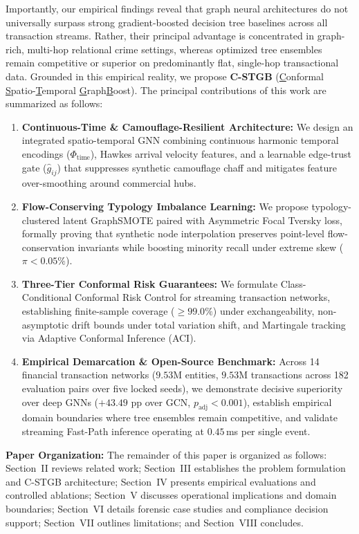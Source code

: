Importantly, our empirical findings reveal that graph neural architectures do not universally surpass strong gradient-boosted decision tree baselines across all transaction streams. Rather, their principal advantage is concentrated in graph-rich, multi-hop relational crime settings, whereas optimized tree ensembles remain competitive or superior on predominantly flat, single-hop transactional data. Grounded in this empirical reality, we propose \textbf{C-STGB} (\underline{C}onformal \underline{S}patio-\underline{T}emporal \underline{G}raph\underline{B}oost). The principal contributions of this work are summarized as follows:
\begin{enumerate}[leftmargin=*,itemsep=1pt,topsep=1pt]
    \item \textbf{Continuous-Time \& Camouflage-Resilient Architecture:} We design an integrated spatio-temporal GNN combining continuous harmonic temporal encodings ($\Phi_{\text{time}}$), Hawkes arrival velocity features, and a learnable edge-trust gate ($\hat{g}_{ij}$) that suppresses synthetic camouflage chaff and mitigates feature over-smoothing around commercial hubs.
    \item \textbf{Flow-Conserving Typology Imbalance Learning:} We propose typology-clustered latent GraphSMOTE paired with Asymmetric Focal Tversky loss, formally proving that synthetic node interpolation preserves point-level flow-conservation invariants while boosting minority recall under extreme skew ($\pi < 0.05\%$).
    \item \textbf{Three-Tier Conformal Risk Guarantees:} We formulate Class-Conditional Conformal Risk Control for streaming transaction networks, establishing finite-sample coverage ($\ge 99.0\%$) under exchangeability, non-asymptotic drift bounds under total variation shift, and Martingale tracking via Adaptive Conformal Inference (ACI).
    \item \textbf{Empirical Demarcation \& Open-Source Benchmark:} Across 14 financial transaction networks ($9.53\text{M}$ entities, $9.53\text{M}$ transactions across 182 evaluation pairs over five locked seeds), we demonstrate decisive superiority over deep GNNs ($+43.49\text{ pp}$ over GCN, $p_{\text{adj}} < 0.001$), establish empirical domain boundaries where tree ensembles remain competitive, and validate streaming Fast-Path inference operating at $0.45$\,ms per single event.
\end{enumerate}

\textbf{Paper Organization:} The remainder of this paper is organized as follows: Section~II reviews related work; Section~III establishes the problem formulation and C-STGB architecture; Section~IV presents empirical evaluations and controlled ablations; Section~V discusses operational implications and domain boundaries; Section~VI details forensic case studies and compliance decision support; Section~VII outlines limitations; and Section~VIII concludes.

